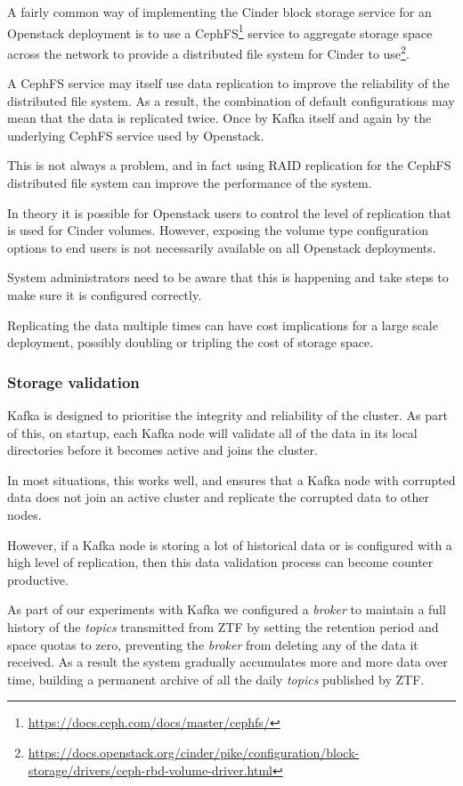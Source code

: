 \documentclass{article}
\newcommand{\openstack} {Openstack\xspace}
\newcommand{\cephfs} {CephFS\xspace}
\newcommand{\kafka} {Kafka\xspace}
\newcommand{\kftopics} {\textit{topics}\xspace}
\newcommand{\kfbroker} {\textit{broker}\xspace}
\newcommand{\ztf} {ZTF\xspace}
\newcommand{\footurl}[1] {\footnote{\url{#1}}}
\begin{document}
A fairly common way of implementing the Cinder block storage service for an \openstack deployment is to use a \cephfs\footurl{https://docs.ceph.com/docs/master/cephfs/} 
service to aggregate storage space across the network to provide a distributed file system for Cinder to use\footurl{https://docs.openstack.org/cinder/pike/configuration/block-storage/drivers/ceph-rbd-volume-driver.html}.

A \cephfs service may itself use data replication to improve the reliability of the distributed file system.
As a result, the combination of default configurations may mean that the data is replicated twice. Once by \kafka itself and again by the underlying \cephfs service used by \openstack.

This is not always a problem, and in fact using RAID replication for the \cephfs distributed file system can improve the performance of the system.

In theory it is possible for \openstack users to control the level of replication that is used for Cinder volumes. However, exposing the volume type configuration options to end users is not necessarily available on all \openstack deployments.

System administrators need to be aware that this is happening and take steps to make sure it is configured correctly. 

Replicating the data multiple times can have cost implications for a large scale deployment, possibly doubling or tripling the cost of storage space.

\subsubsection{Storage validation}
\label{storage-validation}

\kafka is designed to prioritise the integrity and reliability of the cluster.
As part of this, on startup, each \kafka node will validate all of the data in its local directories before it becomes active and joins the cluster.

In most situations, this works well, and ensures that a \kafka node with corrupted data does not join an active cluster and replicate the corrupted data to other nodes.

However, if a \kafka node is storing a lot of historical data or is configured with a high level of replication, then this data validation process can become counter productive.

As part of our experiments with \kafka we configured a \kfbroker to maintain a full history of the \kftopics transmitted from \ztf by setting the retention period and space quotas to zero, preventing the \kfbroker from deleting any of the data it received.
As a result the system gradually accumulates more and more data over time, building a permanent archive of all the daily \kftopics published by \ztf.
\end{document}
